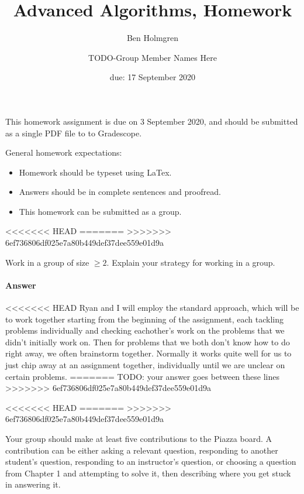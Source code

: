 \documentclass{article}
\title{Advanced Algorithms, Homework \hwnum}
\author{Ben Holmgren}
\author{TODO-Group Member Names Here}
\date{due: 17 September 2020}
\begin{document}
\maketitle

This homework assignment is due on 3 September 2020, and should be
submitted as a single PDF file to to Gradescope.

General homework expectations:
\begin{itemize}
    \item Homework should be typeset using LaTex.
    \item Answers should be in complete sentences and proofread.
    \item This homework can be submitted as a group.
\end{itemize}

\nextprob
<<<<<<< HEAD
=======
>>>>>>> 6ef736806df025e7a80b449def37dee559e01d9a

Work in a group of size $\geq 2$.  Explain your strategy for working in a group.

\paragraph{Answer}


<<<<<<< HEAD
Ryan and I will employ the standard approach, which will be to work together
starting from the beginning of the assignment, each tackling problems individually and
checking eachother's work on the problems that we didn't initially work on. Then for problems
that we both don't know how to do right away, we often brainstorm together. Normally it works
quite well for us to just chip away at an assignment together, individually until we are unclear on
certain problems.
=======
TODO: your answer goes between these lines
>>>>>>> 6ef736806df025e7a80b449def37dee559e01d9a


\nextprob
<<<<<<< HEAD
=======
>>>>>>> 6ef736806df025e7a80b449def37dee559e01d9a

Your group should make at least five contributions to the Piazza board.  A
contribution can be either asking a relevant question, responding to another
student's question, responding to an instructor's question, or choosing a
question from Chapter 1 and attempting to solve it, then  describing where you
get stuck in answering it.
\end{document}
